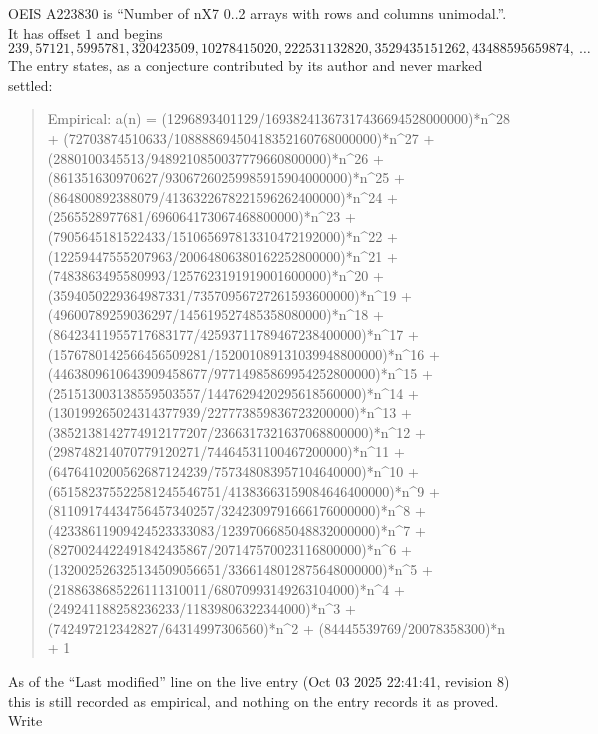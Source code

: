 \documentclass[11pt,a4paper]{article}
\theoremstyle{plain}
\theoremstyle{definition}
\begin{document}
OEIS A223830 is ``Number of nX7 0..2 arrays with rows and columns unimodal.''. It has offset $1$ and begins
\[
239, 57121, 5995781, 320423509, 10278415020, 222531132820, 3529435151262, 43488595659874,\ \dots
\]
The entry states, as a conjecture contributed by its author and never marked settled:
\begin{quote}\raggedright\small
Empirical: a(n) = (1296893401129/16938241367317436694528000000)*n\^{}28 + (72703874510633/10888869450418352160768000000)*n\^{}27 + (2880100345513/9489210850037779660800000)*n\^{}26 + (861351630970627/93067260259985915904000000)*n\^{}25 + (864800892388079/4136322678221596262400000)*n\^{}24 + (2565528977681/696064173067468800000)*n\^{}23 + (7905645181522433/151065697813310472192000)*n\^{}22 + (12259447555207963/20064806380162252800000)*n\^{}21 + (7483863495580993/1257623191919001600000)*n\^{}20 + (3594050229364987331/73570956727261593600000)*n\^{}19 + (49600789259036297/145619527485358080000)*n\^{}18 + (86423411955717683177/42593711789467238400000)*n\^{}17 + (1576780142566456509281/152001089131039948800000)*n\^{}16 + (4463809610643909458677/97714985869954252800000)*n\^{}15 + (251513003138559503557/1447629420295618560000)*n\^{}14 + (130199265024314377939/227773859836723200000)*n\^{}13 + (3852138142774912177207/2366317321637068800000)*n\^{}12 + (298748214070779120271/74464531100467200000)*n\^{}11 + (6476410200562687124239/757348083957104640000)*n\^{}10 + (651582375522581245546751/41383663159084646400000)*n\^{}9 + (81109174434756457340257/3242309791666176000000)*n\^{}8 + (42338611909424523333083/1239706685048832000000)*n\^{}7 + (8270024422491842435867/207147570023116800000)*n\^{}6 + (132002526325134509056651/3366148012875648000000)*n\^{}5 + (2188638685226111310011/68070993149263104000)*n\^{}4 + (249241188258236233/11839806322344000)*n\^{}3 + (742497212342827/64314997306560)*n\^{}2 + (84445539769/20078358300)*n + 1
\end{quote}
As of the ``Last modified'' line on the live entry (Oct 03 2025 22:41:41, revision 8) this is still
recorded as empirical, and nothing on the entry records it as proved. Write
\end{document}
